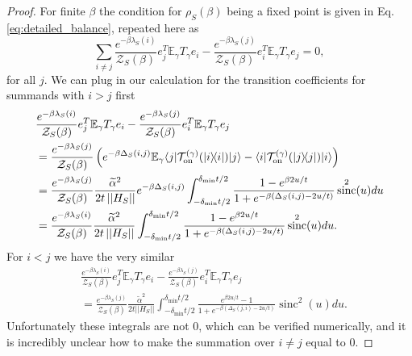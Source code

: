 \documentclass{article}
\newcommand{\on}{\rm on}
\newcommand{\ket}[1]{|#1\rangle}
\newcommand{\bra}[1]{\langle #1|}
\newcommand{\ketbra}[2]{| #1\rangle\! \langle #2|}
\newcommand{\norm}[1]{\left|\left| #1 \right|\right|}
\newcommand{\EE}{\mathbb{E}}
\newcommand{\TT}{\mathcal{T}}
\newcommand{\partfun}{\mathcal{Z}}
\DeclareMathOperator{\sinc}{sinc}
\begin{document}
\begin{proof}
    For finite $\beta$ the condition for $\rho_S(\beta)$ being a fixed point is given in Eq. \eqref{eq:detailed_balance}, repeated here as
    \begin{equation}
        \sum_{i \neq j} \frac{e^{-\beta \lambda_S(i)}}{\partfun_S(\beta)} e_j^T \EE_\gamma T_\gamma e_i - \frac{e^{-\beta \lambda_S(j)}}{\partfun_S(\beta)}  e_i^T \EE_\gamma T_\gamma e_j = 0,
    \end{equation}
    for all $j$. We can plug in our calculation for the transition coefficients for summands with $i > j$ first
    \begin{align}
        &\frac{e^{-\beta \lambda_S(i)}}{\partfun_S(\beta)} e_j^T \EE_\gamma T_\gamma e_i - \frac{e^{-\beta \lambda_S(j)}}{\partfun_S(\beta)}  e_i^T \EE_\gamma T_\gamma e_j \nonumber \\ 
        &= \frac{e^{-\beta \lambda_S(j)}}{\partfun_S(\beta)} \left( e^{-\beta \Delta_S(i,j)} \EE_\gamma \bra{j} \TT_{\on}^{(\gamma)}(\ketbra{i}{i})\ket{j} - \bra{i} \TT_{\on}^{(\gamma)}(\ketbra{j}{j})\ket{i} \right) \\
        &= \frac{e^{-\beta \lambda_S(j)}}{\partfun_S(\beta)} \frac{\widetilde{\alpha}^2}{2 t \norm{H_S}} e^{-\beta \Delta_S(i,j)} \int_{-\delta_{\min} t /2 }^{\delta_{\min} t/ 2} \frac{1 - e^{\beta 2 u / t}}{1 + e^{-\beta(\Delta_S(i,j) - 2u/t)}} \sinc^2(u) du \\
        &= \frac{e^{-\beta \lambda_S(i)}}{\partfun_S(\beta)} \frac{\widetilde{\alpha}^2}{2 t \norm{H_S}} \int_{-\delta_{\min} t /2 }^{\delta_{\min} t/ 2} \frac{1 - e^{\beta 2 u / t}}{1 + e^{-\beta(\Delta_S(i,j) - 2u/t)}} \sinc^2(u) du. \label{eq:zero_knowledge_tmp_1}
    \end{align}
    For $i < j$ we have the very similar
    \begin{align}
        &\frac{e^{-\beta \lambda_S(i)}}{\partfun_S(\beta)} e_j^T \EE_\gamma T_\gamma e_i - \frac{e^{-\beta \lambda_S(j)}}{\partfun_S(\beta)}  e_i^T \EE_\gamma T_\gamma e_j \nonumber \\ 
        &= \frac{e^{-\beta \lambda_S(j)}}{\partfun_S(\beta)} \frac{\widetilde{\alpha}^2}{2 t \norm{H_S}} \int_{-\delta_{\min} t /2 }^{\delta_{\min} t/ 2} \frac{ e^{\beta 2 u / t} - 1}{1 + e^{-\beta(\Delta_S(j, i) - 2u/t)}} \sinc^2(u) du. \label{eq:zero_knowledge_tmp_2}
    \end{align}
    Unfortunately these integrals are not 0, which can be verified numerically, and it is incredibly unclear how to make the summation over $i \neq j$ equal to 0. 
    

\end{proof}
\end{document}
